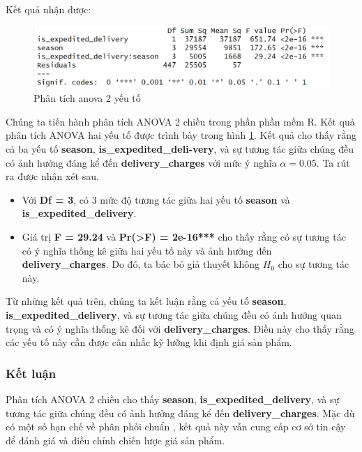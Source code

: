 Kết quả nhận được: 
\begin{figure}[!htbp]
    \centering
    \includegraphics[width=1\linewidth]{graphics/5.4.4.png}
    \caption{Phân tích anova 2 yếu tố}
    \label{fig:5.6}
\end{figure}

Chúng ta tiến hành phân tích ANOVA 2 chiều trong phần phần mềm R. Kết quả phân tích ANOVA hai yếu tố được trình bày trong hình \ref{fig:5.6}. Kết quả cho thấy rằng cả ba yếu tố \textbf{season}, \textbf{is\_expedited\_deli-very}, và sự tương tác giữa chúng đều có ảnh hưởng đáng kể đến \textbf{delivery\_charges} với mức ý nghĩa $\alpha = 0.05$. Ta rút ra được nhận xét sau.
\begin{itemize}
    \item Với \textbf{Df = 3}, có 3 mức độ tương tác giữa hai yếu tố \textbf{season} và \textbf{is\_expedited\_delivery}.
    \item Giá trị \textbf{F = 29.24} và \textbf{Pr(>F) = 2e-16***} cho thấy rằng có sự tương tác có ý nghĩa thống kê giữa hai yếu tố này và ảnh hưởng đến \textbf{delivery\_charges}. Do đó, ta bác bỏ giả thuyết không \(H_0\) cho sự tương tác này.
\end{itemize}

Từ những kết quả trên, chúng ta kết luận rằng cả yếu tố \textbf{season}, \textbf{is\_expedited\_delivery}, và sự tương tác giữa chúng đều có ảnh hưởng quan trọng và có ý nghĩa thống kê đối với \textbf{delivery\_charges}. Điều này cho thấy rằng các yếu tố này cần được cân nhắc kỹ lưỡng khi định giá sản phẩm.
               
\subsubsection{Kết luận}
Phân tích ANOVA 2 chiều cho thấy \textbf{season}, \textbf{is\_expedited\_delivery}, và sự tương tác giữa chúng đều có ảnh hưởng đáng kể đến \textbf{delivery\_charges}. Mặc dù có một số hạn chế về phân phối chuẩn , kết quả này vẫn cung cấp cơ sở tin cậy để đánh giá và điều chỉnh chiến lược giá sản phẩm.